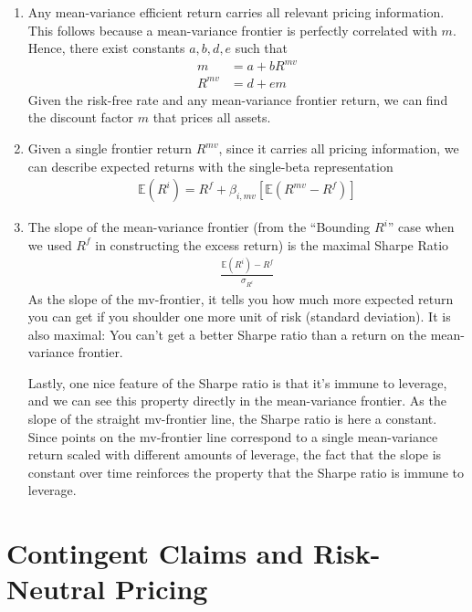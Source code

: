 \documentclass[12pt]{article}
\theoremstyle{plain}
\theoremstyle{definition}
\theoremstyle{remark}
\begin{document}
\begin{enumerate}
  \item Any mean-variance efficient return carries all relevant pricing
    information. This follows because a mean-variance frontier is
    perfectly correlated with $m$. Hence, there exist constants
    $a,b,d,e$ such that
    \begin{align*}
      m &= a + b R^{mv} \\
      R^{mv} &= d + e m
    \end{align*}
    Given the risk-free rate and any mean-variance frontier return, we
    can find the discount factor $m$ that prices all assets.

  \item Given a single frontier return $R^{mv}$, since it carries all
    pricing information, we can describe expected returns with the
    single-beta representation
    \begin{align*}
      \mathbb{E}(R^i) = R^f + \beta_{i,mv} [\mathbb{E}(R^{mv}-R^f)]
    \end{align*}

  \item The slope of the mean-variance frontier (from the ``Bounding
    $R^i$'' case when we used $R^f$ in constructing the excess return)
    is the maximal Sharpe Ratio
    \begin{align*}
      \frac{\mathbb{E}(R^i) - R^f}{\sigma_{R^i}}
    \end{align*}
    As the slope of the mv-frontier, it tells you how much more expected
    return you can get if you shoulder one more unit of risk (standard
    deviation). It is also maximal: You can't get a better Sharpe ratio
    than a return on the mean-variance frontier.

    Lastly, one nice feature of the Sharpe ratio is that it's immune to
    leverage, and we can see this property directly in the mean-variance
    frontier. As the slope of the straight mv-frontier line, the Sharpe
    ratio is here a constant. Since points on the mv-frontier line
    correspond to a single mean-variance return scaled with different
    amounts of leverage, the fact that the slope is constant over time
    reinforces the property that the Sharpe ratio is immune to leverage.

\end{enumerate}

\clearpage
\section{Contingent Claims and Risk-Neutral Pricing}
\end{document}
